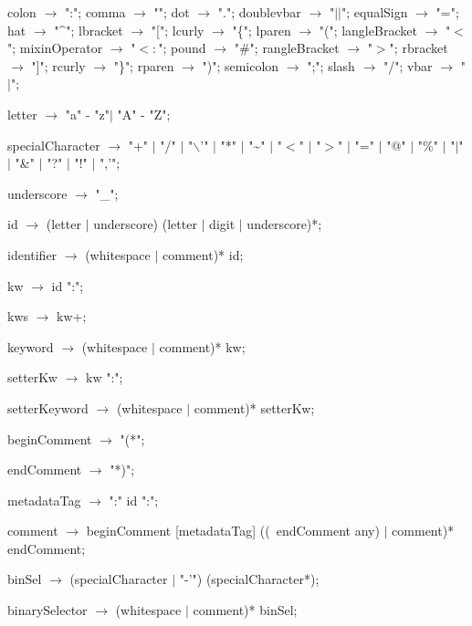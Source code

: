 \documentclass{article}
\begin{document}
\begin{newspeak}  
  
 colon $\rightarrow$  ":";
 comma $\rightarrow$  "";
 dot $\rightarrow$ ".";
 doublevbar $\rightarrow$ "$||$";
 equalSign $\rightarrow$ "=";
 hat $\rightarrow$ "\^{}";
 lbracket $\rightarrow$ "[";
 lcurly $\rightarrow$ "\{";
 lparen $\rightarrow$ "(";
 langleBracket $\rightarrow$ "$<$";
 mixinOperator $\rightarrow$  "$<:$";
 pound $\rightarrow$ "\#";
 rangleBracket $\rightarrow$ "$>$";
 rbracket $\rightarrow$ "]";
 rcurly $\rightarrow$ "\}";
 rparen $\rightarrow$ ")";
 semicolon $\rightarrow$ ";";
 slash $\rightarrow$ "/";
 vbar $\rightarrow$ "$|$";
 
                                                                                                       
 letter $\rightarrow$   "a" - "z"$|$  "A" - "Z";
                                                             
  specialCharacter $\rightarrow$   "+"   $|$  "/" $|$   "$\backslash$'" $|$  "*"   $|$  "\~{}"  $|$ 
                                        "$<$" $|$  "$>$" $|$  "=" $|$  "@"  $|$  "\%" $|$ 
                                      "$|$"  $|$  "\&" $|$  "?"  $|$  "!" $|$   ",'";      
                                     
 underscore $\rightarrow$  "\_";                                                       

 id $\rightarrow$ (letter $|$ underscore)  (letter $|$ digit $|$ underscore)*;
                                           
 identifier $\rightarrow$  (whitespace $|$ comment)*  id;

 kw $\rightarrow$ id  ":"; 

 kws $\rightarrow$ kw+;   
  
 keyword $\rightarrow$ (whitespace $|$ comment)*  kw; 

 setterKw $\rightarrow$ kw  ":"; 

 setterKeyword $\rightarrow$ (whitespace $|$ comment)*  setterKw;  

 beginComment $\rightarrow$   "(*";

 endComment $\rightarrow$  "*)";
 
 metadataTag $\rightarrow$  ":" id  ":";
 
 comment $\rightarrow$ beginComment  [metadataTag] ((~endComment any) $|$ comment)*	endComment;
 
 binSel $\rightarrow$  (specialCharacter $|$  "-'") (specialCharacter*);
                                           
 binarySelector $\rightarrow$ (whitespace $|$ comment)*  binSel;
\end{newspeak}
\end{document}
